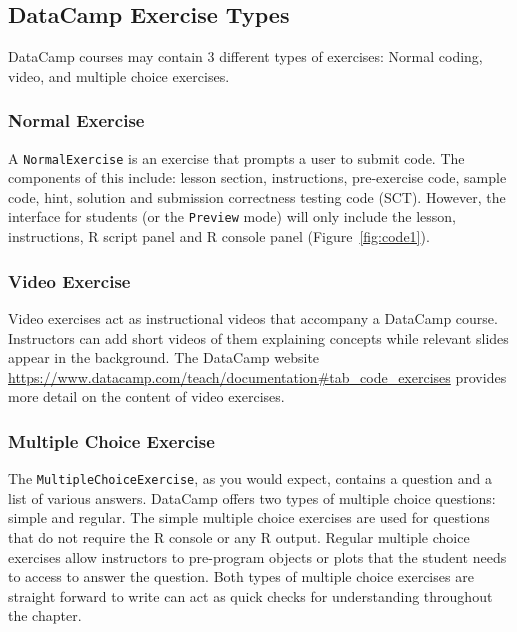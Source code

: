 \documentclass[12pt]{article}\usepackage[]{graphicx}\usepackage[]{color}
\begin{document}
\subsection{DataCamp Exercise Types}
DataCamp courses may contain 3 different types of exercises: Normal coding, video, and multiple choice exercises.
\subsubsection{Normal Exercise}
A \texttt{NormalExercise} is an exercise that prompts a user to submit code. The components of this include: lesson section, instructions, pre-exercise code, sample code, hint, solution and submission correctness testing code (SCT). However, the interface for students (or the \texttt{Preview}
mode) will only include the lesson, instructions, R script panel and R console panel (Figure~\ref{fig:code1}).
\subsubsection{Video Exercise}
Video exercises act as instructional videos that accompany a DataCamp course. Instructors can add short videos of them explaining concepts while 
relevant slides appear in the background. The DataCamp website \url{https://www.datacamp.com/teach/documentation#tab_code_exercises} provides 
more detail on the content of video exercises. 

\subsubsection{Multiple Choice Exercise}

The \texttt{MultipleChoiceExercise}, as you would expect, contains a question and a list of various answers. 
DataCamp offers two types of multiple choice questions: simple and regular. 
The simple multiple choice exercises are used for questions that do not require the R console or any R output. Regular multiple choice exercises 
allow instructors to pre-program objects or plots that the student needs to access to answer the question. Both types of multiple choice exercises 
are straight forward to write can act as quick checks for understanding throughout the chapter.
\end{document}
